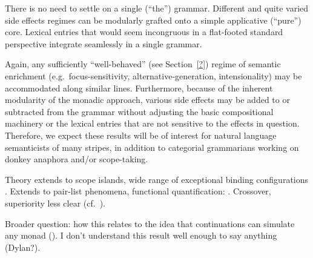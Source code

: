 	There is no need to settle on a single (``the'') grammar. Different and quite varied side effects regimes can be modularly grafted onto a simple applicative (``pure'') core. Lexical entries that would seem incongruous in a flat-footed standard perspective integrate seamlessly in a single grammar. %
	
	Again, any sufficiently ``well-behaved'' (see Section~\ref{?}) regime of semantic enrichment (e.g.~focus-sensitivity, alternative-generation, intensionality) may be accommodated along similar lines. Furthermore, because of the inherent modularity of the monadic approach, various side effects may be added to or subtracted from the grammar without adjusting the basic compositional machinery or the lexical entries that are not sensitive to the effects in question. Therefore, we expect these results will be of interest for natural language semanticists of many stripes, in addition to categorial grammarians working on donkey anaphora and/or scope-taking. %
	
	Theory extends to scope islands, wide range of exceptional binding configurations \citealt{Charlow:diss}. Extends to pair-list phenomena, functional quantification: \citealt{Bumford:inc}. Crossover, superiority less clear (cf.~\citealt{ShanBarker:2006, BarkerShan:2008}). %
	
	Broader question: how this relates to the idea that continuations can simulate any monad (\citealt{Filinski:1994}). I don't understand this result well enough to say anything (Dylan?). %

{\small}

